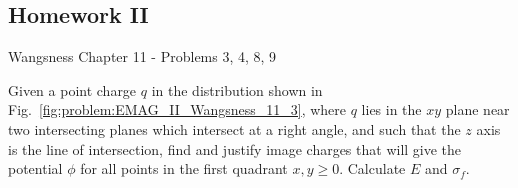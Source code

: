             \subsection{Homework II}
                Wangsness Chapter 11 - Problems 3, 4, 8, 9
                \begin{problem}
                    \label{problem:EMAG_II_Wangsness_11_3}
                    Given a point charge $q$ in the distribution shown
                    in Fig.~\ref{fig:problem:EMAG_II_Wangsness_11_3},
                    where $q$ lies in the $xy$ plane near two
                    intersecting planes which intersect at a right angle,
                    and such that the $z$ axis is the line of
                    intersection, find and justify image charges that
                    will give the potential $\phi$ for all points in
                    the first quadrant $x,y\geq{0}$.
                    Calculate $E$ and $\sigma_{f}$.
                \end{problem}
